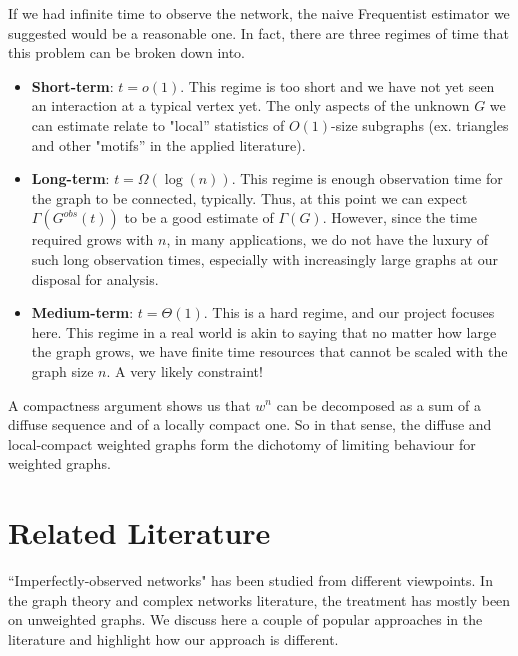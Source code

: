 If we had infinite time to observe the network, the naive Frequentist estimator we suggested would be a reasonable one.  In fact, there are three regimes of time that this problem can be broken down into.  

\begin{itemize}
    \item \textbf{ Short-term}: $t = o(1)$. This regime is too short and we have not yet seen an interaction at a typical vertex yet.  The only aspects of the unknown $G$ we can estimate relate to "local'' statistics of $O(1)$-size subgraphs (ex. triangles and other "motifs'' in the applied literature).  
    \item \textbf{ Long-term}: $t = \Omega(\log(n))$.  This  regime is enough observation time for the graph to be connected, typically.  Thus, at this point we can expect $\Gamma(G^{obs}(t))$ to be a good estimate of $\Gamma(G)$.  However, since the time required grows with $n$, in many applications, we do not have the luxury of such long observation times, especially with increasingly large graphs at our disposal for analysis.  
    \item \textbf{ Medium-term}: $t = \Theta(1)$.   This is a hard regime, and our project focuses here.  This regime in a real world is akin to saying that no matter how large the graph grows, we have finite time resources that cannot be scaled with the graph size $n$. A very likely constraint!
\end{itemize}
A compactness argument shows us that $w^{n}$ can be decomposed as a sum of a diffuse sequence and of a locally compact one.  So in that sense, the diffuse and local-compact weighted graphs form the dichotomy of limiting behaviour for weighted graphs.  

\section{Related Literature}
``Imperfectly-observed networks" has been studied from different viewpoints.  In the graph theory and complex networks literature, the treatment has mostly been on unweighted graphs.  We discuss here a couple of popular approaches in the literature and highlight how our approach is different.  

